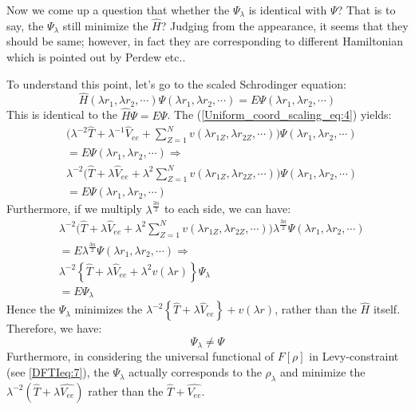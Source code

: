 Now we come up a question that whether the
$\Psi_{\lambda}$ is identical with $\Psi$? That is to say, the
$\Psi_{\lambda}$ still minimize the $\hat{H}$? Judging from the
appearance, it seems that they should be same; however, in fact they
are corresponding to different Hamiltonian which is pointed out by
Perdew etc.\cite{PhysRevA.32.2010}.

To understand this point, let's go to the scaled Schrodinger equation:
\begin{equation}
\label{Uniform_coord_scaling_eq:4}
\hat{H}(\lambda r_{1},\lambda r_{2},\cdots)
\Psi(\lambda r_{1},\lambda r_{2},\cdots) = 
E\Psi(\lambda r_{1},\lambda r_{2},\cdots)  
\end{equation}
This is identical to the $\hat{H}\Psi = E\Psi$. The
(\ref{Uniform_coord_scaling_eq:4}) yields:
\begin{equation}
  \begin{split}
&\Bigg(\lambda^{-2}\hat{T} + \lambda^{-1}\hat{V}_{ee} + 
\sum_{Z=1}^{N}v(\lambda r_{1Z}, \lambda r_{2Z}, \cdots)\Bigg)
\Psi(\lambda r_{1},\lambda r_{2},\cdots) \\
&=  E\Psi(\lambda r_{1},\lambda r_{2},\cdots) \Rightarrow \\
&\lambda^{-2}\Bigg(\hat{T} + \lambda\hat{V}_{ee} + 
\lambda^{2}\sum_{Z=1}^{N}v(\lambda r_{1Z}, \lambda r_{2Z}, \cdots)\Bigg)
\Psi(\lambda r_{1},\lambda r_{2},\cdots) \\
&=  E\Psi(\lambda r_{1},\lambda r_{2},\cdots)      
  \end{split}
\label{Uniform_coord_scaling_eq:5}
\end{equation}
Furthermore, if we multiply $\lambda^{\frac{3n}{2}}$ to each side, we
can have:
\begin{equation}
  \label{Uniform_coord_scaling_eq:6}
  \begin{split}
  &\lambda^{-2}\Bigg(\hat{T} + \lambda\hat{V}_{ee} + 
\lambda^{2}\sum_{Z=1}^{N}v(\lambda r_{1Z}, \lambda r_{2Z}, \cdots)\Bigg)
\lambda^{\frac{3n}{2}}\Psi(\lambda r_{1},\lambda r_{2},\cdots) \\
&=  E\lambda^{\frac{3n}{2}}\Psi(\lambda r_{1},\lambda
r_{2},\cdots) \Rightarrow \\
& \lambda^{-2}\left\{\hat{T} + \lambda\hat{V}_{ee} + \lambda^{2}
v(\lambda r)\right\}\Psi_{\lambda} \\
&= E\Psi_{\lambda}  
  \end{split}
\end{equation}
Hence the $\Psi_{\lambda}$ minimizes the $\lambda^{-2}\left\{\hat{T} +
\lambda\hat{V}_{ee}\right\} + v(\lambda r)$, rather than the $\hat{H}$
itself. Therefore, we have:
\begin{equation}
  \label{Uniform_coord_scaling_eq:7}
  \Psi_{\lambda} \neq \Psi
\end{equation}
Furthermore, in considering the universal
functional of $F[\rho]$ in Levy-constraint (see \ref{DFTIeq:7}), the
$\Psi_{\lambda}$ actually corresponds to the $\rho_{\lambda}$ and  
minimize the $\lambda^{-2}(\hat{T} + \lambda
\hat{V_{ee}})$ rather than the $\hat{T} + \hat{V_{ee}}$. 

